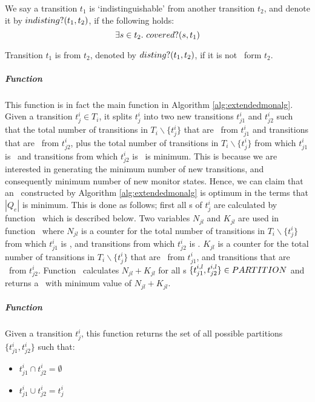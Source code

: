 \begin{definition}
\label{def:indisting}
We say a transition $t_1$ is `indistinguishable' from another transition 
$t_2$, and denote it by $indisting?(t_1, t_2)$, if the following holds:
$$\exists s \in t_2 . ~ covered?(s, t_1)$$

Transition $t_1$ is \textit{\dist} from $t_2$, denoted by $disting?(t_1, t_2)$, if it is not \indist~form $t_2$.
\end{definition}


\subparagraph{Function \splitt} This function is in fact the main function in Algorithm \ref{alg:extendedmonalg}. Given a transition $t_j^i \in T_i$, it splits $t_j^i$ into two new transitions $t_{j1}^i$ and $t_{j2}^i$ such that the total number of transitions in $T_i \backslash \{t_j^i\}$ that are \indist~from $t_{j1}^i$ and transitions that are \indist~from $t_{j2}^i$, plus the total number of transitions in $T_i \backslash \{t_j^i\}$ from which $t_{j1}^i$ is \indist~and transitions from which $t_{j2}^i$ is \indist~is minimum. This is because we are interested in generating the minimum number of new transitions, and consequently minimum number of new monitor states. Hence, we can claim that an \Exltl~constructed by Algorithm \ref{alg:extendedmonalg} is optimum in the terms that $|Q_e|$ is minimum.
This is done as follows; first all \textit{\partitionn}s of $t_j^i$ are calculated by function \partition~which is described below. Two variables $N_{jl}$ and $K_{jl}$ are used in function \splitt~where $N_{jl}$ is a counter for the total number of transitions in $T_i \backslash \{t_j^i\}$ from which $t_{j1}^i$ is \indist, and transitions from which $t_{j2}^i$ is \indist. $K_{jl}$ is a counter for the total number of transitions in $T_i \backslash \{t_j^i\}$ that are \indist~from $t_{j1}^i$, and transitions that are \indist~from $t_{j2}^i$. Function \splitt~calculates $N_{jl} + K_{jl}$ for all \partitionn s $\{t_{j1}^{i,l}, t_{j2}^{i,l}\} \in PARTITION$ and returns a \partitionn~with minimum value of $N_{jl} + K_{jl}$. 




\subparagraph{Function \partition} Given a transition $t_j^i$, this function returns the set of all possible partitions $\{t_{j1}^i, t_{j2}^i\}$ such that:

\begin{itemize}
\item  $t_{j1}^i \cap t_{j2}^i = \emptyset$
\item  $t_{j1}^i \cup t_{j2}^i = t_j^i$
\end{itemize}

